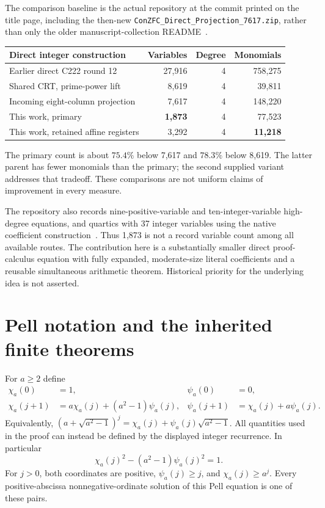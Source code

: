 \documentclass[11pt]{article}
\theoremstyle{definition}
\theoremstyle{remark}
\newcommand{\File}[1]{\nolinkurl{#1}}
\begin{document}
The comparison baseline is the actual repository at the commit printed
on the title page, including the then-new
\File{ConZFC_Direct_Projection_7617.zip}, rather than only the older
manuscript-collection README~\cite{repo,projection,latest}.

\begin{center}\small
\begin{tabular}{lrrr}
\toprule
Direct integer construction & Variables & Degree & Monomials\\
\midrule
Earlier direct C222 round 12 & 27,916 & 4 & 758,275\\
Shared CRT, prime-power lift & 8,619 & 4 & 39,811\\
Incoming eight-column projection & 7,617 & 4 & 148,220\\
This work, primary & \textbf{1,873} & 4 & 77,523\\
This work, retained affine registers & 3,292 & 4 & \textbf{11,218}\\
\bottomrule
\end{tabular}
\end{center}

The primary count is about $75.4\%$ below 7,617 and $78.3\%$ below 8,619.
The latter parent has fewer monomials than the primary; the second supplied
variant addresses that tradeoff. These comparisons are not uniform claims
of improvement in every measure.

The repository also records nine-positive-variable and ten-integer-variable
high-degree equations, and quartics with 37 integer variables using the
native coefficient construction~\cite{size}. Thus 1,873 is not a record
variable count among all available routes. The contribution here is a
substantially smaller direct proof-calculus equation with fully expanded,
moderate-size literal coefficients and a reusable simultaneous arithmetic
theorem. Historical priority for the underlying idea is not asserted.

\section{Pell notation and the inherited finite theorems}

For $a\ge2$ define
\begin{align*}
 \chi_a(0)&=1,&\psi_a(0)&=0,\\
 \chi_a(j+1)&=a\chi_a(j)+(a^2-1)\psi_a(j),&
 \psi_a(j+1)&=\chi_a(j)+a\psi_a(j).
\end{align*}
Equivalently,
$(a+\sqrt{a^2-1})^j=\chi_a(j)+\psi_a(j)\sqrt{a^2-1}$.
All quantities used in the proof can instead be defined by the displayed
integer recurrence. In particular
\[
 \chi_a(j)^2-(a^2-1)\psi_a(j)^2=1.
\]
For $j>0$, both coordinates are positive, $\psi_a(j)\ge j$, and
$\chi_a(j)\ge a^j$. Every positive-abscissa nonnegative-ordinate solution
of this Pell equation is one of these pairs.
\end{document}
